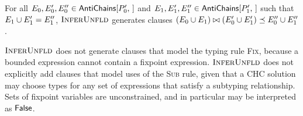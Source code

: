 For all $E_0, E_0', E_0'' \in \antichains{ P_0' }$ and %
$E_1, E_1', E_1'' \in \antichains{ P_1' }$ such that $E_1 \cup E_1'
= E_1''$, $\textsc{InferUnfld}$ generates clauses $(E_0 \cup E_1) \bowtie
(E_0' \cup E_1') \preceq E_0'' \cup E_1''$.


$\textsc{InferUnfld}$ does not generate clauses that model the typing rule
\textsc{Fix}, because a bounded expression cannot contain a fixpoint
expression.
%
$\textsc{InferUnfld}$ does not explicitly add clauses that model uses of the
\textsc{Sub} rule, given that a CHC solution may choose types for any
set of expressions that satisfy a subtyping relationship.
%
Sets of fixpoint variables are unconstrained, and in particular may be
interpreted as $\mathsf{False}$.

